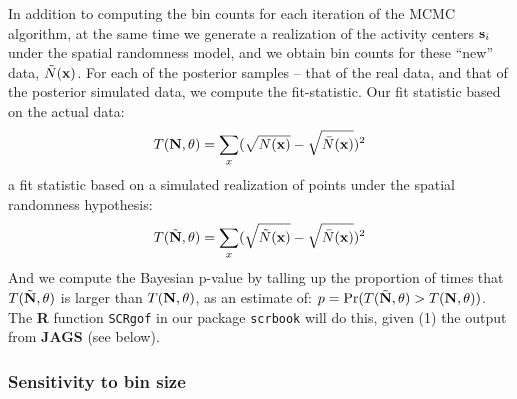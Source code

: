 In addition to computing the bin counts for each iteration of the MCMC
algorithm, at the same time we generate a realization of the activity
centers ${\bf s}_{i}$ under the spatial randomness model, and we
obtain bin counts for these ``new'' data, $\tilde{N}({\bf x})$. For each of
the posterior samples -- that of the real data, and that of the
posterior simulated data, we compute the fit-statistic.  Our fit
statistic based on the actual data:
\[
T({\bf N},\theta) = \sum_{x}  (\sqrt{N({\bf x})} - \sqrt{ \bar{N}({\bf x})})^2
\]
a fit statistic based on a simulated realization of points under the
spatial randomness hypothesis:
\[
T(\tilde{\bf N},\theta) = \sum_{x}  (\sqrt{\tilde{N}({\bf x})} - \sqrt{
  \bar{N}({\bf x})})^2
\]
And we compute the Bayesian p-value by talling up the proportion of
times that $T(\tilde{\bf N},\theta)$ is larger than $T({\bf
  N},\theta)$, as an estimate of: $p = \Pr(T(\tilde{\bf N},\theta) >
T({\bf N},\theta))$.  The {\bf R} function {\tt SCRgof} in our package
\mbox{\tt scrbook} will do this, given (1) the output from {\bf JAGS}
(see below).



\subsubsection{Sensitivity to bin size}

